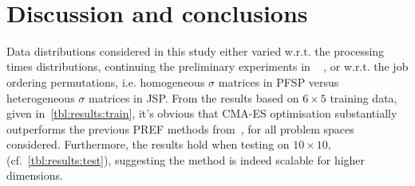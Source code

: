 \documentclass{acm_proc_article-sp}
\begin{document}
\begin{table}[b!]
\\

\end{table}






\section{Discussion and conclusions}\label{sec:disc}
Data distributions considered in this study either varied 
w.r.t. the processing times distributions, continuing the preliminary experiments in ~\cite{InRu11a} , or 
w.r.t. the job ordering permutations, i.e. homogeneous $\sigma$ matrices in PFSP versus heterogeneous $\sigma$ matrices in JSP. 
From the results based on $6\times5$ training data, given  in~\cref{tbl:results:train}, it's obvious that CMA-ES optimisation substantially outperforms the previous PREF methods from~\cite{InRu11a}, for all problem spaces considered. Furthermore, the results hold when testing on $10\times10$, (cf.~\cref{tbl:results:test}), suggesting the method is indeed  scalable for higher dimensions. 
\end{document}

